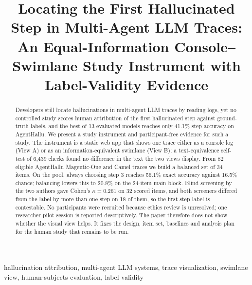 \documentclass[conference]{IEEEtran}
\begin{document}
\title{Locating the First Hallucinated Step in Multi-Agent LLM Traces: An Equal-Information Console--Swimlane Study Instrument with Label-Validity Evidence}

\author{
\and
{}
}

\maketitle

\begin{abstract}
Developers still locate hallucinations in multi-agent LLM traces by reading logs, yet no controlled study scores human attribution of the first hallucinated step against ground-truth labels, and the best of 13 evaluated models reaches only 41.1\% step accuracy on AgentHallu. We present a study instrument and participant-free evidence for such a study. The instrument is a static web app that shows one trace either as a console log (View A) or as an information-equivalent swimlane (View B); a text-equivalence self-test of 6,439 checks found no difference in the text the two views display. From 82 eligible AgentHallu Magentic-One and Camel traces we build a balanced set of 34 items. On the pool, always choosing step 3 reaches 56.1\% exact accuracy against 16.5\% chance; balancing lowers this to 20.8\% on the 24-item main block. Blind screening by the two authors gave Cohen's $\kappa = 0.261$ on 32 scored items, and both screeners differed from the label by more than one step on 18 of them, so the first-step label is contestable. No participants were recruited because ethics review is unresolved; one researcher pilot session is reported descriptively. The paper therefore does not show whether the visual view helps. It fixes the design, item set, baselines and analysis plan for the human study that remains to be run.
\end{abstract}

\begin{IEEEkeywords}
hallucination attribution, multi-agent LLM systems, trace visualization, swimlane view, human-subjects evaluation, label validity
\end{IEEEkeywords}
\end{document}

